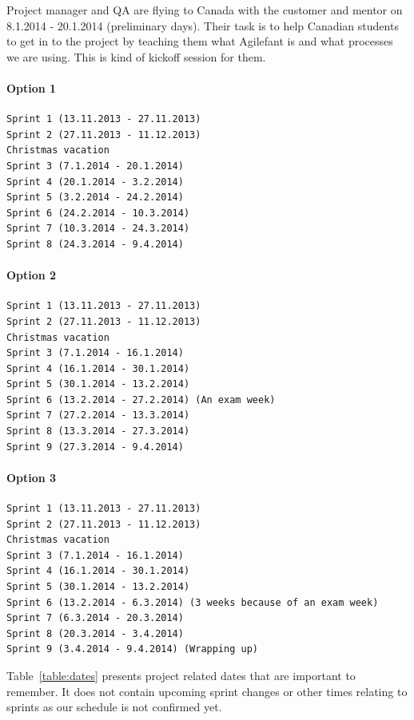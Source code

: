 Project manager and QA are flying to Canada with the customer and mentor on
8.1.2014 - 20.1.2014 (preliminary days). Their task is to help Canadian students
to get in to the project by teaching them what Agilefant is and what processes
we are using. This is kind of kickoff session for them.

\paragraph{Option 1}

\begin{verbatim}
Sprint 1 (13.11.2013 - 27.11.2013)
Sprint 2 (27.11.2013 - 11.12.2013)
Christmas vacation
Sprint 3 (7.1.2014 - 20.1.2014)
Sprint 4 (20.1.2014 - 3.2.2014)
Sprint 5 (3.2.2014 - 24.2.2014)
Sprint 6 (24.2.2014 - 10.3.2014)
Sprint 7 (10.3.2014 - 24.3.2014)
Sprint 8 (24.3.2014 - 9.4.2014) 
\end{verbatim}

\paragraph{Option 2}

\begin{verbatim}
Sprint 1 (13.11.2013 - 27.11.2013)
Sprint 2 (27.11.2013 - 11.12.2013)
Christmas vacation
Sprint 3 (7.1.2014 - 16.1.2014)
Sprint 4 (16.1.2014 - 30.1.2014)
Sprint 5 (30.1.2014 - 13.2.2014)
Sprint 6 (13.2.2014 - 27.2.2014) (An exam week)
Sprint 7 (27.2.2014 - 13.3.2014)
Sprint 8 (13.3.2014 - 27.3.2014)
Sprint 9 (27.3.2014 - 9.4.2014)
\end{verbatim}

\paragraph{Option 3}

\begin{verbatim}
Sprint 1 (13.11.2013 - 27.11.2013)
Sprint 2 (27.11.2013 - 11.12.2013)
Christmas vacation
Sprint 3 (7.1.2014 - 16.1.2014)
Sprint 4 (16.1.2014 - 30.1.2014)
Sprint 5 (30.1.2014 - 13.2.2014)
Sprint 6 (13.2.2014 - 6.3.2014) (3 weeks because of an exam week)
Sprint 7 (6.3.2014 - 20.3.2014)
Sprint 8 (20.3.2014 - 3.4.2014)
Sprint 9 (3.4.2014 - 9.4.2014) (Wrapping up) 
\end{verbatim}

Table~\ref{table:dates} presents project related dates that are important to
remember. It does not contain upcoming sprint changes or other times relating to
sprints as our schedule is not confirmed yet.

